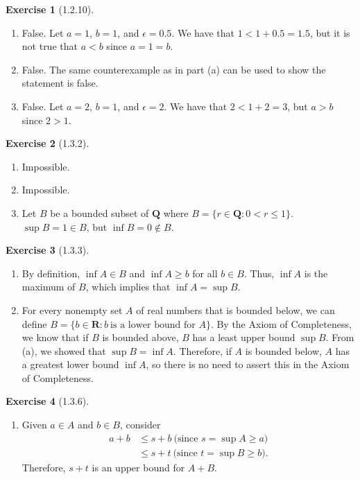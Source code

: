 \documentclass{amsart}
\theoremstyle{definition}
\newtheorem{exercise}{Exercise}
\newcommand{\Q}{\mathbf{Q}}
\newcommand{\R}{\mathbf{R}}
\newcommand{\st}{\mathrel{:}}
\begin{document}
\begin{exercise}[1.2.10]
  \begin{enumerate}[label={(\alph*)}]
    \item False. Let $a = 1$, $b = 1$, and $\epsilon = 0.5$. We have that $1 < 1
      + 0.5 = 1.5$, but it is not true that $a < b$ since $a = 1 = b$.
    \item False. The same counterexample as in part (a) can be used to show the
      statement is false.
    \item False. Let $a = 2$, $b = 1$, and $\epsilon = 2$. We have that $2 < 1 +
      2 = 3$, but $a > b$ since $2 > 1$.
  \end{enumerate}
\end{exercise}

\begin{exercise}[1.3.2]
  \begin{enumerate}[label={(\alph*)}]
    \item Impossible.
    \item Impossible.
    \item Let $B$ be a bounded subset of $\Q$ where $B = \{r \in \Q \st 0 < r
      \le 1 \}$. $\sup{B} = 1 \in B$, but $\inf{B} = 0 \notin B$.
  \end{enumerate}
\end{exercise}

\begin{exercise}[1.3.3]
  \begin{enumerate}[label={(\alph*)}]
    \item By definition, $\inf{A} \in B$ and $\inf{A} \ge b$ for all $b \in B$.
      Thus, $\inf{A}$ is the maximum of $B$, which implies that $\inf{A} =
      \sup{B}$.
    \item For every nonempty set $A$ of real numbers that is bounded below, we
      can define $B = \{b \in \R \st b\ \text{is a lower bound for $A$}\}$. By
      the Axiom of Completeness, we know that if $B$ is bounded above, $B$ has a
      least upper bound $\sup{B}$. From (a), we showed that $\sup{B} = \inf{A}$.
      Therefore, if $A$ is bounded below, $A$ has a greatest lower bound
      $\inf{A}$, so there is no need to assert this in the Axiom of
      Completeness.
  \end{enumerate}
\end{exercise}

\begin{exercise}[1.3.6]
  \begin{enumerate}[label={(\alph*)}]
    \item Given $a \in A$ and $b \in B$, consider
      \begin{align*}
        a + b &\le s + b\ \text{(since $s = \sup{A} \ge a$)} \\
        &\le s + t\ \text{(since $t = \sup{B} \ge b$)}.
      \end{align*}
      Therefore, $s + t$ is an upper bound for $A + B$.
  \end{enumerate}
\end{exercise}
\end{document}
